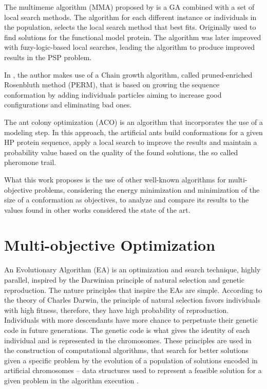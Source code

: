 The multimeme algorithm (MMA) proposed by \cite{krasnogor2002multimeme} is a GA combined with a set of local search methods. The algorithm for each different instance or individuals in the population, selects the local search method that best fits. Originally used to find solutions for the functional model protein. The algorithm was later improved with fuzy-logic-based local searches, leading the algorithm to produce improved results in the PSP problem.


In \cite{hsu2003growth}, the author makes use of a Chain growth algorithm, called pruned-enriched Rosenbluth method (PERM), that is based on growing the sequence conformation by adding individuals particles aiming to increase good configurations and eliminating bad ones.


The ant colony optimization (ACO) \cite{shmygelska2002ant, shmygelska2003improved} is an algorithm that incorporates the use of a modeling step. In this approach, the artificial ants build conformations for a given HP protein sequence, apply a local search to improve the results and maintain a probability value based on the quality of the found solutions, the so called pheromone trail.


What this work proposes is the use of other well-known algorithms for multi-objective problems, considering the energy minimization and minimization of the size of a conformation as objectives, to analyze and compare its results to the values found in other works considered the state of the art.


\section{Multi-objective Optimization} \label{sec:optimization}


An Evolutionary Algorithm (EA) is an optimization and search technique, highly parallel, inspired by the Darwinian principle of natural selection and genetic reproduction. The nature principles that inspire the EAs are simple. According to the theory of Charles Darwin, the principle of natural selection favors individuals with high fitness, therefore, they have high probability of reproduction. Individuals with more descendants have more chance to perpetuate their genetic code in future generations. The genetic code is what gives the identity of each individual and is represented in the chromosomes. These principles are used in the construction of computational algorithms, that search for better solutions given a specific problem by the evolution of a population of solutions encoded in artificial chromosomes -- data structures used to represent a feasible solution for a given problem in the algorithm execution \cite{pacheco1999algoritmos}.



